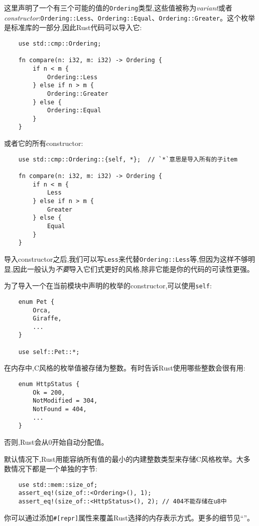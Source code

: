 这里声明了一个有三个可能的值的\texttt{Ordering}类型,这些值被称为\emph{variant}或者\emph{constructor}:\texttt{Ordering::Less}、\texttt{Ordering::Equal}、\texttt{Ordering::Greater}。这个枚举是标准库的一部分,因此Rust代码可以导入它:
\begin{verbatim}
    use std::cmp::Ordering;

    fn compare(n: i32, m: i32) -> Ordering {
        if n < m {
            Ordering::Less
        } else if n > m {
            Ordering::Greater
        } else {
            Ordering::Equal
        }
    }
\end{verbatim}

或者它的所有constructor:
\begin{verbatim}
    use std::cmp::Ordering::{self, *};  // `*`意思是导入所有的子item

    fn compare(n: i32, m: i32) -> Ordering {
        if n < m {
            Less
        } else if n > m {
            Greater
        } else {
            Equal
        }
    }
\end{verbatim}

导入constructor之后,我们可以写\texttt{Less}来代替\texttt{Ordering::Less}等,但因为这样不够明显,因此一般认为\emph{不要}导入它们式更好的风格,除非它能是你的代码的可读性更强。

为了导入一个在当前模块中声明的枚举的constructor,可以使用\texttt{self}:
\begin{verbatim}
    enum Pet {
        Orca,
        Giraffe,
        ...
    }

    use self::Pet::*;
\end{verbatim}

在内存中,C风格的枚举值被存储为整数。有时告诉Rust使用哪些整数会很有用:
\begin{verbatim}
    enum HttpStatus {
        Ok = 200,
        NotModified = 304,
        NotFound = 404,
        ...
    }
\end{verbatim}

否则,Rust会从0开始自动分配值。

默认情况下,Rust用能容纳所有值的最小的内建整数类型来存储C风格枚举。大多数情况下都是一个单独的字节:
\begin{verbatim}
    use std::mem::size_of;
    assert_eq!(size_of::<Ordering>(), 1);
    assert_eq!(size_of::<HttpStatus>(), 2); // 404不能存储在u8中
\end{verbatim}

你可以通过添加\texttt{\#[repr]}属性来覆盖Rust选择的内存表示方式。更多的细节见“”。

